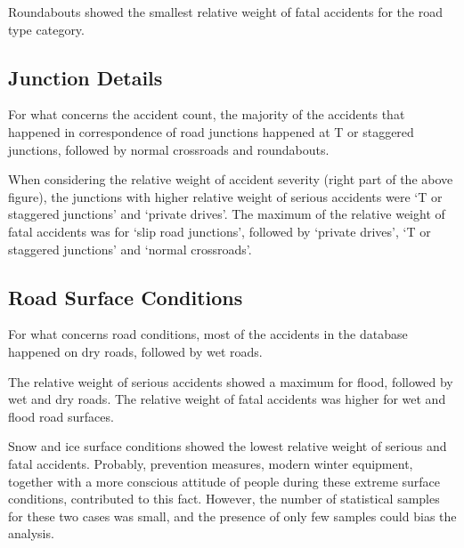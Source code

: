 \documentclass[11pt]{article}
\begin{document}
Roundabouts showed the smallest relative weight of fatal accidents for the road type category.

    \hypertarget{junction-details}{%
\subsection{Junction Details}\label{junction-details}}

    \begin{center}
    \end{center}

For what concerns the accident count, the majority of the accidents that happened in correspondence of road junctions happened at T or staggered junctions, followed by normal crossroads and roundabouts.

When considering the relative weight of accident severity (right part of the above figure), the junctions with higher relative weight of serious accidents were `T or staggered junctions' and `private drives'. The maximum of the relative weight of fatal accidents was for `slip road junctions', followed by `private drives', `T or staggered junctions' and `normal crossroads'.

    \hypertarget{road-surface-conditions}{%
\subsection{Road Surface Conditions}\label{road-surface-conditions}}

    \begin{center}
    \end{center}

For what concerns road conditions, most of the accidents in the database happened on dry roads, followed by wet roads.

The relative weight of serious accidents showed a maximum for flood, followed by wet and dry roads. The relative weight of fatal accidents was higher for wet and flood road surfaces.

Snow and ice surface conditions showed the lowest relative weight of serious and fatal accidents. Probably, prevention measures, modern winter equipment, together with a more conscious attitude of people during these extreme surface conditions, contributed to this fact. However, the number of statistical samples for these two cases was small, and the presence of only few samples could bias the analysis.
\end{document}
